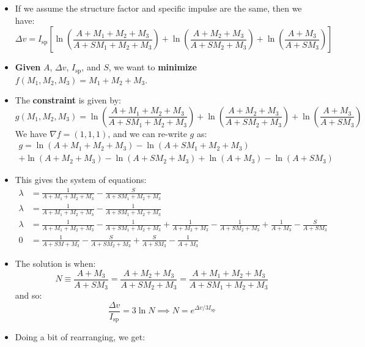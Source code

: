 \begin{itemize}
    \item If we assume the structure factor and specific impulse are the same, then we have:
    \begin{equation}
        \Delta v = I_\text{sp} \left[\ln\left(\frac{A+M_1+M_2+M_3}{A+SM_1+M_2+M_3} \right) + \ln\left(\frac{A+M_2+M_3}{A+SM_2+M_3} \right)  + \ln\left(\frac{A+M_3}{A+SM_3} \right)\right]
    \end{equation}
    \item \textbf{Given} $A$, $\Delta v$, $I_\text{sp}$, and $S$, we want to \textbf{minimize} $f(M_1, M_2, M_3)=M_1+M_2+M_3$.
    \item The \textbf{constraint} is given by:
    \begin{equation}
        g(M_1, M_2, M_3) = \ln\left(\frac{A+M_1+M_2+M_3}{A+SM_1+M_2+M_3} \right) + \ln\left(\frac{A+M_2+M_3}{A+SM_2+M_3} \right)  + \ln\left(\frac{A+M_3}{A+SM_3} \right)
    \end{equation}
    We have $\nabla f = (1,1,1)$, and we can re-write $g$ as:
    \begin{align*}
        g = \ln(A+M_1+M_2+M_3)-\ln(A+SM_1 + M_2 + M_3) \\ + \ln(A+M_2+M_3)-\ln(A+SM_2+M_3)+\ln(A+M_3)-\ln(A+SM_3)
    \end{align*}
    \item This gives the system of equations:
    \begin{align}
        \lambda &= \frac{1}{A+M_1+M_2+M_3} - \frac{S}{A+SM_1+M_2+M_3} \\ 
        \lambda &= \frac{1}{A+M_1+M_2+M_3} - \frac{1}{A+SM_1+M_2+M_3} \\ 
        \lambda &= \frac{1}{A+M_1+M_2+M_3} - \frac{1}{A+SM_1+M_2+M_3} + \frac{1}{A+M_2+M_3} - \frac{1}{A+SM_2+M_3} + \frac{1}{A+M_3} - \frac{S}{A+SM_3} \\ 
        0 &= \frac{1}{A+SM+M_3} - \frac{S}{A+SM_2+M_3} + \frac{S}{A+SM_3} - \frac{1}{A+M_3}
    \end{align}
    \item The solution is when:
    \begin{equation}
        N \equiv \frac{A+M_3}{A+SM_3} = \frac{A+M_2+M_3}{A+SM_2+M_3} = \frac{A+M_1+M_2+M_3}{A+SM_1+M_2+M_3}
    \end{equation}
    and so:
    \begin{equation}
        \frac{\Delta v}{I_\text{sp}} = 3\ln N \implies N = e^{\Delta v/3I_\text{sp}}
    \end{equation}
    \item Doing a bit of rearranging, we get:

\end{itemize}
